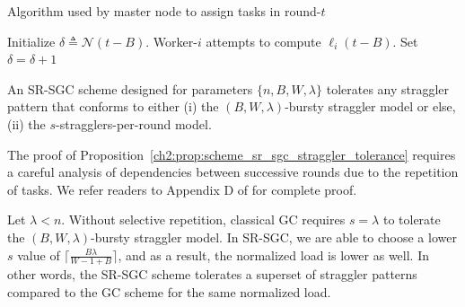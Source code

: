 

\begin{algorithm}[H]
    \caption{Algorithm used by master node to assign tasks in round-$t$}
    \label{ch2:alg:constr_sr_sgc}	
    \begin{algorithmic}
        \State Initialize $\delta\triangleq\mathcal{N}(t-B)$.
        \State Worker-$i$ attempts to compute $\ell_i(t-B)$.
        \State Set $\delta=\delta+1$
        \Else
        \EndIf
        \EndFor
    \end{algorithmic}	
\end{algorithm}


\begin{prop}\label{ch2:prop:scheme_sr_sgc_straggler_tolerance}
    An SR-SGC scheme designed for parameters  $\{n, B, W, \lambda\}$ tolerates any straggler pattern that conforms to either (i) the $(B, W, \lambda)$-bursty straggler model or else, (ii) the $s$-stragglers-per-round model.
\end{prop}

The proof of Proposition~\ref{ch2:prop:scheme_sr_sgc_straggler_tolerance} requires a careful analysis of dependencies between successive rounds due to the repetition of tasks. We refer readers to Appendix D of \cite{krishnan2023sequential} for complete proof.

\begin{remark}\normalfont
    Let $\lambda<n$. Without selective repetition, classical GC requires $s=\lambda$ to tolerate the $(B,W,\lambda)$-bursty straggler model. In SR-SGC, we are able to choose a lower $s$ value of $\lceil\frac{B\lambda}{W-1+B}\rceil$, and as a result, the normalized load is lower as well. In other words, the SR-SGC scheme tolerates a superset of straggler patterns compared to the GC scheme for the same normalized load.
\end{remark}

